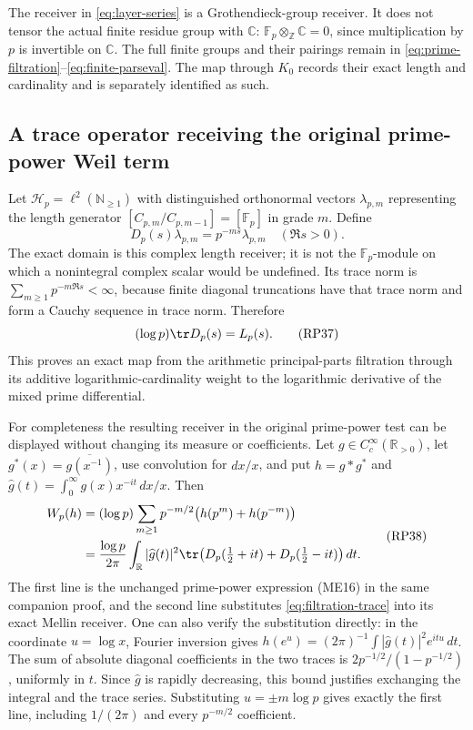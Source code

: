 \documentclass[11pt,a4paper]{article}
\theoremstyle{definition}\newtheorem{definition}[theorem]{Definition}
\begin{document}
The receiver in \eqref{eq:layer-series} is a Grothendieck-group receiver.
It does not tensor the actual finite residue group with $\mathbb C$:
$\mathbb F_p\otimes_{\mathbb Z}\mathbb C=0$, since multiplication by
$p$ is invertible on $\mathbb C$. The full finite groups and their
pairings remain in \eqref{eq:prime-filtration}--\eqref{eq:finite-parseval}.
The map through $K_0$ records their exact length and cardinality and
is separately identified as such.

\subsection{A trace operator receiving the original prime-power Weil term}

Let $\mathcal H_p=\ell^2(\mathbb N_{\ge1})$ with distinguished
orthonormal vectors $\lambda_{p,m}$ representing the length generator
$[C_{p,m}/C_{p,m-1}]=[\mathbb F_p]$ in grade $m$. Define
\[
 D_p(s)\lambda_{p,m}=p^{-ms}\lambda_{p,m}\quad(\Re s>0).
 \tag{RP36}\label{eq:filtration-trace-operator}
\]
The exact domain is this complex length receiver; it is not the
$\mathbb F_p$-module on which a nonintegral complex scalar would be
undefined. Its trace norm is
$\sum_{m\ge1}p^{-m\Re s}<\infty$, because finite diagonal truncations
have that trace norm and form a Cauchy sequence in trace norm. Therefore
\[
 (\log p)\tr D_p(s)=L_p(s).
 \tag{RP37}\label{eq:filtration-trace}
\]
This proves an exact map from the arithmetic principal-parts filtration
through its additive logarithmic-cardinality weight to the logarithmic
derivative of the mixed prime differential.

For completeness the resulting receiver in the original prime-power
test can be displayed without changing its measure or coefficients.
Let $g\in C_c^\infty(\mathbb R_{>0})$, let
$g^*(x)=\overline{g(x^{-1})}$, use convolution for $dx/x$, and put
$h=g*g^*$ and
$\widehat g(t)=\int_0^\infty g(x)x^{-it}\,dx/x$. Then
\[
\begin{split}
 W_p(h)
 &=(\log p)\sum_{m\ge1}p^{-m/2}\bigl(h(p^m)+h(p^{-m})\bigr)\\
 &=\frac{\log p}{2\pi}\int_{\mathbb R}|\widehat g(t)|^2
 \tr\bigl(D_p(\tfrac12+it)+D_p(\tfrac12-it)\bigr)\,dt.
\end{split}
 \tag{RP38}\label{eq:filtration-Weil-term}
\]
The first line is the unchanged prime-power expression (ME16) in the
same companion proof, and the second line substitutes
\eqref{eq:filtration-trace} into its exact Mellin receiver. One can
also verify the substitution directly: in the coordinate $u=\log x$,
Fourier inversion gives
$h(e^u)=(2\pi)^{-1}\int|\widehat g(t)|^2e^{itu}\,dt$.
The sum of absolute diagonal coefficients in the two traces is
$2p^{-1/2}/(1-p^{-1/2})$, uniformly in $t$. Since $\widehat g$ is
rapidly decreasing, this bound justifies exchanging the integral and
the trace series. Substituting $u=\pm m\log p$ gives exactly the first
line, including $1/(2\pi)$ and every $p^{-m/2}$ coefficient.
\end{document}
